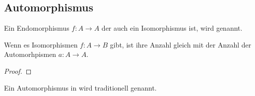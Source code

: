 \documentclass[parskip=half]{scrreprt}
\begin{document}
\newpage
\subsection{Automorphismus}

\begin{definition}[Automorphismus]
Ein Endomorphismus $f: A → A$ der auch ein Isomorphismus ist,
wird  genannt.
\end{definition}

\begin{theorem}
Wenn es Isomorphismen $f: A → B$ gibt, ist ihre Anzahl gleich mit der 
Anzahl der Automorhpismen $a: A → A$.
\end{theorem}
\begin{proof}
\end{proof}

\begin{remark}
Ein Automorphismus in  wird traditionell 
genannt.
\end{remark}

\end{document}
